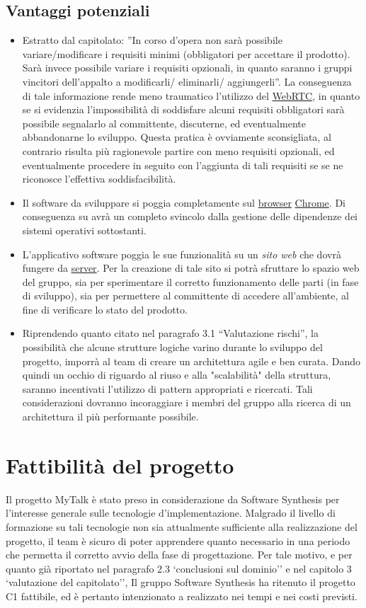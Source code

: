 \subsection{Vantaggi potenziali}
\begin{itemize}
	\item Estratto dal capitolato: ''In corso d'opera non sarà possibile variare/modificare i requisiti minimi (obbligatori per accettare il prodotto). Sarà invece possibile variare i requisiti opzionali, in quanto saranno i gruppi vincitori dell'appalto a modificarli/ eliminarli/ aggiungerli''. La conseguenza di tale informazione rende meno traumatico l'utilizzo del \underline{WebRTC}, in quanto se si evidenzia l'impossibilità di soddisfare alcuni requisiti obbligatori sarà possibile segnalarlo al committente, discuterne, ed eventualmente abbandonarne lo sviluppo. Questa pratica è ovviamente sconsigliata, al contrario risulta più ragionevole partire con meno requisiti opzionali, ed eventualmente procedere in seguito con l'aggiunta di tali requisiti se se ne riconosce l'effettiva soddisfacibilità.
	\item Il software da sviluppare si poggia completamente sul \underline{browser} \underline{Chrome}. Di conseguenza su avrà un completo svincolo dalla gestione delle dipendenze dei sistemi operativi sottostanti.
	\item L'applicativo software poggia le sue funzionalità su un \textit{sito web} che dovrà fungere da \underline{server}. Per la creazione di tale sito si potrà sfruttare lo spazio web del gruppo, sia per sperimentare il corretto funzionamento delle parti (in fase di sviluppo), sia per permettere al committente di accedere all'ambiente, al fine di verificare lo stato del prodotto.
	\item Riprendendo quanto citato nel paragrafo 3.1 ``Valutazione rischi'', la possibilità che alcune strutture logiche varino durante lo sviluppo del progetto, imporrà al team di creare un architettura agile e ben curata. Dando quindi un occhio di riguardo al riuso e alla "scalabilità" della struttura, saranno incentivati l'utilizzo di pattern appropriati e ricercati. Tali considerazioni dovranno incoraggiare i membri del gruppo alla ricerca di un architettura il più performante possibile.
\end{itemize}
\clearpage
\section{Fattibilità del progetto}
Il progetto MyTalk è stato preso in considerazione da Software Synthesis per l'interesse generale sulle tecnologie d'implementazione. Malgrado il livello di formazione su tali tecnologie non sia attualmente sufficiente alla realizzazione del progetto, il team è sicuro di poter apprendere quanto necessario in una periodo che permetta il corretto avvio della fase di progettazione. Per tale motivo, e per quanto già riportato nel paragrafo 2.3 `conclusioni sul dominio'' e nel capitolo 3 `valutazione del capitolato'', Il gruppo Software Synthesis ha ritenuto il progetto C1 fattibile, ed è pertanto intenzionato a realizzato nei tempi e nei costi previsti.
\clearpage

